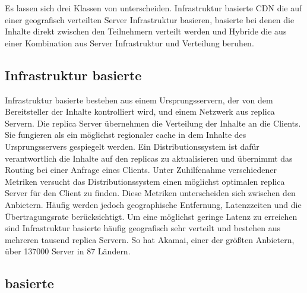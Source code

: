 Es lassen sich drei Klassen von \cdns unterscheiden. Infrastruktur basierte CDN die auf einer geografisch verteilten Server Infrastruktur basieren, \pTp basierte \cdns bei denen die Inhalte direkt zwischen den Teilnehmern verteilt werden und Hybride \cdns die aus einer Kombination aus Server Infrastruktur und \pTp Verteilung beruhen.

\subsection{Infrastruktur basierte \cdns}
Infrastruktur basierte \cdns bestehen aus einem Ursprungsservern, der von dem Bereitsteller der Inhalte kontrolliert wird, und einem Netzwerk aus replica Servern. Die replica Server übernehmen die Verteilung der Inhalte an die Clients. Sie fungieren als ein möglichst regionaler cache in dem Inhalte des Ursprungsservers gespiegelt werden. Ein Distributionssystem ist dafür verantwortlich die Inhalte auf den replicas zu aktualisieren und übernimmt das Routing bei einer Anfrage eines Clients. Unter Zuhilfenahme verschiedener Metriken versucht das Distributionssystem einen möglichst optimalen replica Server für den Client zu finden. Diese Metriken unterscheiden sich zwischen den Anbietern. Häufig werden jedoch geographische Entfernung, Latenzzeiten und die Übertragungsrate berücksichtigt. Um eine möglichst geringe Latenz zu erreichen sind Infrastruktur basierte \cdns häufig geografisch sehr verteilt und bestehen aus mehreren tausend replica Servern. So hat Akamai, einer der größten \cdn Anbietern, über 137000 Server in 87 Ländern. \cite{akamaiPeer} 


\subsection{\pTp basierte \cdns }

%
%


